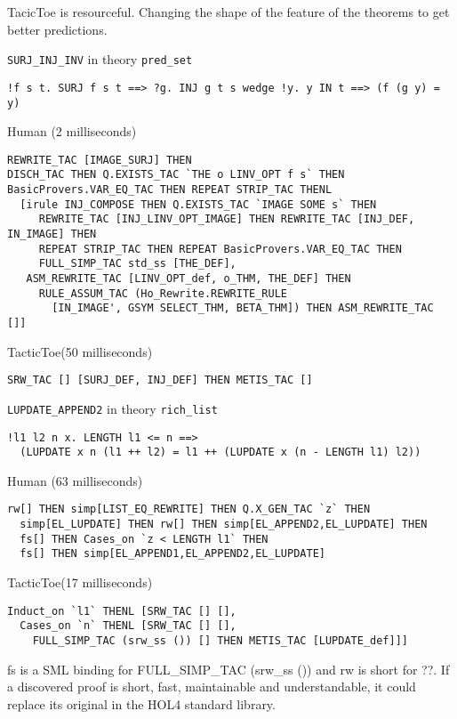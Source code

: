 \documentclass[runningheads,a4paper,draft]{svjour3}
\def\holfour{\textsf{HOL4}\xspace}
\def\sml{\textsf{SML}\xspace}
\def\tactictoe{\textsf{TacticToe}\xspace}
\begin{document}
TacicToe is resourceful. Changing the shape of the feature of the theorems
to get better predictions.

\begin{example} \texttt{SURJ\_INJ\_INV} in theory \texttt{pred\_set}
\begin{lstlisting}[language=SMLSmall]
!f s t. SURJ f s t ==> ?g. INJ g t s wedge !y. y IN t ==> (f (g y) = y)
\end{lstlisting}
Human (2 milliseconds)
\begin{lstlisting}[language=SMLSmall]
REWRITE_TAC [IMAGE_SURJ] THEN
DISCH_TAC THEN Q.EXISTS_TAC `THE o LINV_OPT f s` THEN
BasicProvers.VAR_EQ_TAC THEN REPEAT STRIP_TAC THENL
  [irule INJ_COMPOSE THEN Q.EXISTS_TAC `IMAGE SOME s` THEN
     REWRITE_TAC [INJ_LINV_OPT_IMAGE] THEN REWRITE_TAC [INJ_DEF, IN_IMAGE] THEN
     REPEAT STRIP_TAC THEN REPEAT BasicProvers.VAR_EQ_TAC THEN
     FULL_SIMP_TAC std_ss [THE_DEF],
   ASM_REWRITE_TAC [LINV_OPT_def, o_THM, THE_DEF] THEN
     RULE_ASSUM_TAC (Ho_Rewrite.REWRITE_RULE
       [IN_IMAGE', GSYM SELECT_THM, BETA_THM]) THEN ASM_REWRITE_TAC []]
\end{lstlisting}
\tactictoe (50 milliseconds)
\begin{lstlisting}[language=SMLSmall]
SRW_TAC [] [SURJ_DEF, INJ_DEF] THEN METIS_TAC []
\end{lstlisting}
\end{example}

\begin{example} \texttt{LUPDATE\_APPEND2} in theory \texttt{rich\_list}
\begin{lstlisting}[language=SMLSmall]
!l1 l2 n x. LENGTH l1 <= n ==>
  (LUPDATE x n (l1 ++ l2) = l1 ++ (LUPDATE x (n - LENGTH l1) l2))
\end{lstlisting}
Human (63 milliseconds)
\begin{lstlisting}[language=SMLSmall]
  rw[] THEN simp[LIST_EQ_REWRITE] THEN Q.X_GEN_TAC `z` THEN
  simp[EL_LUPDATE] THEN rw[] THEN simp[EL_APPEND2,EL_LUPDATE] THEN
  fs[] THEN Cases_on `z < LENGTH l1` THEN
  fs[] THEN simp[EL_APPEND1,EL_APPEND2,EL_LUPDATE]
\end{lstlisting}
\tactictoe (17 milliseconds)
\begin{lstlisting}[language=SMLSmall]
Induct_on `l1` THENL [SRW_TAC [] [],
  Cases_on `n` THENL [SRW_TAC [] [],
    FULL_SIMP_TAC (srw_ss ()) [] THEN METIS_TAC [LUPDATE_def]]]
\end{lstlisting}
\end{example}


fs is a \sml binding for FULL\_SIMP\_TAC (srw\_ss ()) and rw is short for ??.
If a discovered proof is short, fast, maintainable and
understandable, it could replace its original in the \holfour standard library.
\end{document}
